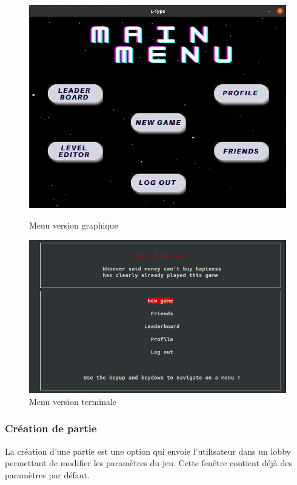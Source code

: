 \documentclass[a4paper,12pt]{article}
\begin{document}
\begin{figure}[hbtp]
    \centering
    \includegraphics[scale=0.5]{SRD/images/menuGui.png}
    \caption{Menu version graphique }
    
    \includegraphics[scale=0.5]{SRD/images/menuTerm.png}
    \caption{Menu version terminale }
\end{figure}

\newpage

\subsubsection{Création de partie}
La création d'une partie est une option qui envoie l'utilisateur dans un lobby permettant de modifier les paramètres du jeu.
Cette fenêtre contient déjà des paramètres par défaut.
\end{document}
